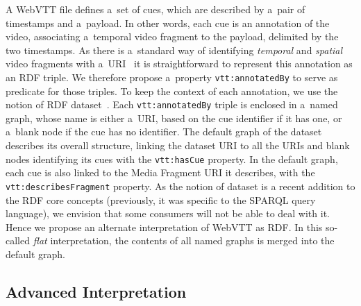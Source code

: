 \documentclass{sig-alternate}
\newcommand{\vtt}[1]{\texttt{vtt:#1}}
\begin{document}
A WebVTT file defines a~set of cues,
which are described by a~pair of timestamps and a~payload.
In other words, each cue is an annotation of the video,
associating a~temporal video fragment to the payload,
delimited by the two timestamps.
As there is a~standard way of identifying \emph{temporal}
and \emph{spatial} video fragments
with a~URI~\cite{troncy2012mediafragments}
it is straightforward to represent this annotation as an RDF triple.
We therefore propose a~property \vtt{annotatedBy}
to serve as predicate for those triples.
To keep the context of each annotation,
we use the notion of RDF dataset~\cite{cyganiak2014rdf11concepts}.
Each \vtt{annotatedBy} triple is enclosed in a~named graph,
whose name is either a~URI, based on the cue identifier if it has one,
or a~blank node if the cue has no identifier.
The default graph of the dataset describes its overall structure,
linking the dataset URI to all the URIs and blank nodes identifying its cues
with the \vtt{hasCue} property.
In the default graph, each cue is also linked to
the Media Fragment URI it describes,
with the \vtt{describesFragment} property. 
As the notion of dataset is a recent addition to the RDF core concepts
(previously, it was specific to the SPARQL query language),
we envision that some consumers will not be able to deal with it.
Hence we propose an alternate interpretation of WebVTT as RDF.
In this so-called \emph{flat} interpretation,
the contents of all named graphs is merged into the default graph.

\subsection{Advanced Interpretation}
\end{document}
